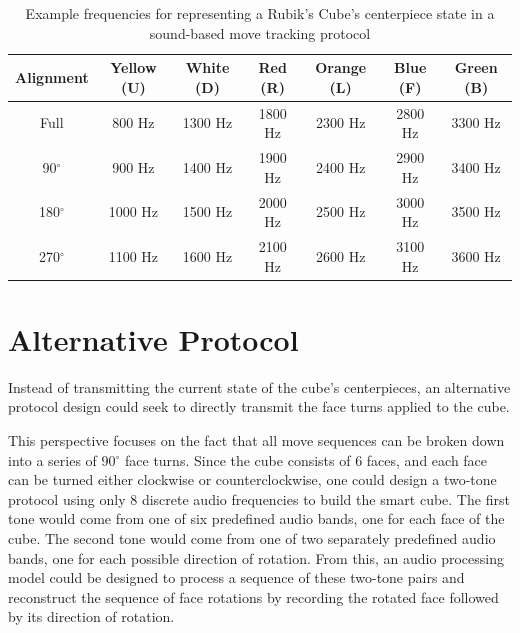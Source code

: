 \begin{table}[h]
    \centering
    \begin{tabular}{ | c | c | c | c | c | c | c | }
        \hline
        Alignment & Yellow (U) & White (D) & Red (R) & Orange (L) & Blue (F) & Green (B)\\
        \hline
        \hline
        Full & 800 Hz & 1300 Hz & 1800 Hz & 2300 Hz & 2800 Hz & 3300 Hz\\
        90$^\circ$ & 900 Hz & 1400 Hz & 1900 Hz & 2400 Hz & 2900 Hz & 3400 Hz\\
        180$^\circ$ & 1000 Hz & 1500 Hz & 2000 Hz & 2500 Hz & 3000 Hz & 3500 Hz\\
        270$^\circ$ & 1100 Hz & 1600 Hz & 2100 Hz & 2600 Hz & 3100 Hz & 3600 Hz\\
        \hline
    \end{tabular}
    \caption{Example frequencies for representing a Rubik's Cube's centerpiece state in a sound-based move tracking protocol}
    \label{table:centerpiece-frequencies}
\end{table}


\section{Alternative Protocol}
\label{sec:alternatives}
Instead of transmitting the current state of the cube's centerpieces, an alternative protocol design could seek to directly transmit the face turns applied to the cube.

This perspective focuses on the fact that all move sequences can be broken down into a series of 90$^\circ$ face turns.
Since the cube consists of 6 faces, and each face can be turned either clockwise or counterclockwise, one could design a two-tone protocol using only 8 discrete audio frequencies to build the smart cube.
The first tone would come from one of six predefined audio bands, one for each face of the cube. 
The second tone would come from one of two separately predefined audio bands, one for each possible direction of rotation.
From this, an audio processing model could be designed to process a sequence of these two-tone pairs and reconstruct the sequence of face rotations by recording the rotated face followed by its direction of rotation.

